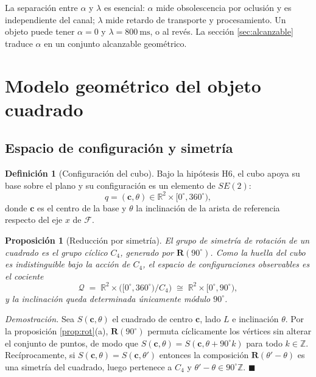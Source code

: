 \documentclass[11pt,a4paper]{article}
\newtheorem{proposicion}[teorema]{Proposición}
\theoremstyle{definition}
\newtheorem{definicion}[teorema]{Definición}
\newenvironment{demo}{\par\noindent\textit{Demostración.}\;}{\hfill$\blacksquare$\par\medskip}
\newcommand{\R}{\mathbb{R}}
\newcommand{\Rot}{\mathbf{R}}
\newcommand{\cc}{\mathbf{c}}
\newcommand{\grados}{^{\circ}}
\begin{document}
La separación entre $\alpha$ y $\lambda$ es esencial: $\alpha$ mide obsolescencia por
oclusión y es independiente del canal; $\lambda$ mide retardo de transporte y
procesamiento. Un objeto puede tener $\alpha = 0$ y $\lambda = 800\ \mathrm{ms}$, o al
revés. La sección \ref{sec:alcanzable} traduce $\alpha$ en un conjunto alcanzable
geométrico.

\section{Modelo geométrico del objeto cuadrado}
\label{sec:cuadrado}

\subsection{Espacio de configuración y simetría}
\label{sec:simetria}

\begin{definicion}[Configuración del cubo]
Bajo la hipótesis H6, el cubo apoya su base sobre el plano y su configuración es un
elemento de $SE(2)$:
\[
  q = (\cc, \theta) \in \R^2 \times [0\grados, 360\grados),
\]
donde $\cc$ es el centro de la base y $\theta$ la inclinación de la arista de
referencia respecto del eje $x$ de $\mathcal F$.
\end{definicion}

\begin{proposicion}[Reducción por simetría]
\label{prop:simetria}
El grupo de simetría de rotación de un cuadrado es el grupo cíclico $C_4$, generado por
$\Rot(90\grados)$. Como la huella del cubo es indistinguible bajo la acción de $C_4$, el
espacio de configuraciones \emph{observables} es el cociente
\[
  \mathcal{Q} \;=\; \R^2 \times \big([0\grados,360\grados)/C_4\big)
  \;\cong\; \R^2 \times [0\grados, 90\grados),
\]
y la inclinación queda determinada únicamente módulo $90\grados$.
\end{proposicion}

\begin{demo}
Sea $S(\cc,\theta)$ el cuadrado de centro $\cc$, lado $L$ e inclinación $\theta$. Por la
proposición \ref{prop:rot}(a), $\Rot(90\grados)$ permuta cíclicamente los vértices sin
alterar el conjunto de puntos, de modo que $S(\cc,\theta) = S(\cc,\theta + 90\grados k)$
para todo $k\in\mathbb Z$. Recíprocamente, si $S(\cc,\theta)=S(\cc,\theta')$ entonces la
composición $\Rot(\theta'-\theta)$ es una simetría del cuadrado, luego pertenece a $C_4$
y $\theta'-\theta \in 90\grados\mathbb Z$.
\end{demo}
\end{document}
